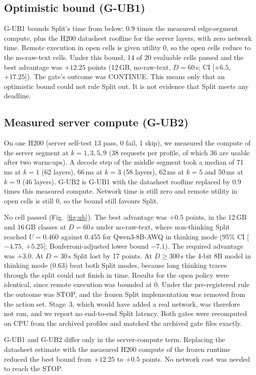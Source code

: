 \documentclass[lettersize,journal]{IEEEtran}
\begin{document}
\subsection{Optimistic bound (G-UB1)}
G-UB1 bounds Split's time from below: 0.9 times the measured edge-segment compute, plus the H200 datasheet roofline for the server layers, with zero network time. Remote execution in open cells is given utility 0, so the open cells reduce to the no-raw-text cells. Under this bound, 14 of 20 evaluable cells passed and the best advantage was $+12.25$ points (12\,GB, no-raw-text, $D=60$\,s; CI [$+6.5$, $+17.25$]). The gate's outcome was CONTINUE. This means only that an optimistic bound could not rule Split out. It is not evidence that Split meets any deadline.

\subsection{Measured server compute (G-UB2)}
On one H200 (server self-test 13 pass, 0 fail, 1 skip), we measured the compute of the server segment at $k=1,3,5,9$ (38 requests per profile, of which 36 are usable after two warm-ups). A decode step of the middle segment took a median of 71\,ms at $k=1$ (62 layers), 66\,ms at $k=3$ (58 layers), 62\,ms at $k=5$ and 50\,ms at $k=9$ (46 layers). G-UB2 is G-UB1 with the datasheet roofline replaced by 0.9 times this measured compute. Network time is still zero and remote utility in open cells is still 0, so the bound still favours Split.

No cell passed (Fig.~\ref{fig:ub}). The best advantage was $+0.5$ points, in the 12\,GB and 16\,GB classes at $D=60$\,s under no-raw-text, where non-thinking Split reached $U=0.460$ against $0.455$ for Qwen3-8B-AWQ in thinking mode (95\% CI [$-4.75$, $+5.25$]; Bonferroni-adjusted lower bound $-7.1$). The required advantage was $+3.0$. At $D=30$\,s Split lost by 17 points. At $D\geq300$\,s the 4-bit 8B model in thinking mode (0.63) beat both Split modes, because long thinking traces through the split could not finish in time. Results for the open policy were identical, since remote execution was bounded at 0. Under the pre-registered rule the outcome was STOP, and the frozen Split implementation was removed from the action set. Stage~3, which would have added a real network, was therefore not run, and we report no end-to-end Split latency. Both gates were recomputed on CPU from the archived profiles and matched the archived gate files exactly.

G-UB1 and G-UB2 differ only in the server-compute term. Replacing the datasheet estimate with the measured H200 compute of the frozen runtime reduced the best bound from $+12.25$ to $+0.5$ points. No network cost was needed to reach the STOP.
\end{document}
